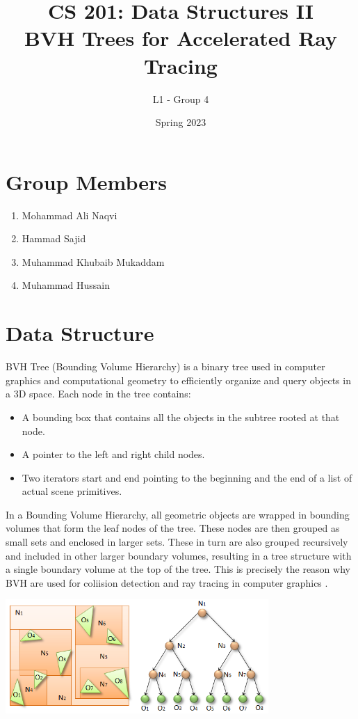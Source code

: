 \documentclass{article}
\title {CS 201: Data Structures II \\BVH Trees for Accelerated Ray Tracing} %
\author{L1 - Group 4} %
\date{Spring 2023}
\begin{document}
\maketitle

\section{Group Members}
\begin{enumerate}
  \item Mohammad Ali Naqvi
  \item Hammad Sajid
  \item Muhammad Khubaib Mukaddam
  \item Muhammad Hussain
\end{enumerate}
\section{Data Structure}

BVH Tree (Bounding Volume Hierarchy) is a binary tree used in computer graphics and computational
geometry to efficiently organize and query objects in a 3D space. Each node in the tree contains:
\begin{itemize}
  \item A bounding box that contains all the objects in the subtree rooted at that node.
  \item A pointer to the left and right child nodes.
  \item Two iterators start and end pointing to the beginning and the end of a list of actual scene primitives.
\end{itemize}

In a Bounding Volume Hierarchy, all geometric objects are wrapped in bounding volumes that form the leaf nodes of the tree.
These nodes are then grouped as small sets and enclosed in larger sets. These in turn are also grouped recursively and included in other larger boundary volumes,
resulting in a tree structure with a single boundary volume at the top of the tree. This is precisely the reason why BVH are used for coliision detection
and ray tracing in computer graphics \cite{paper}.

\begin{center}
  \includegraphics*[width = 10cm]{faarigh.png}
\end{center}
\end{document}
